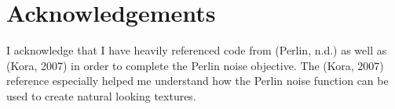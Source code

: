 \chapter*{Acknowledgements}

I acknowledge that I have heavily referenced code from (Perlin, n.d.) as well as
(Kora, 2007) in order to complete the Perlin noise objective. The (Kora, 2007)
reference especially helped me understand how the Perlin noise function can be
used to create natural looking textures.

